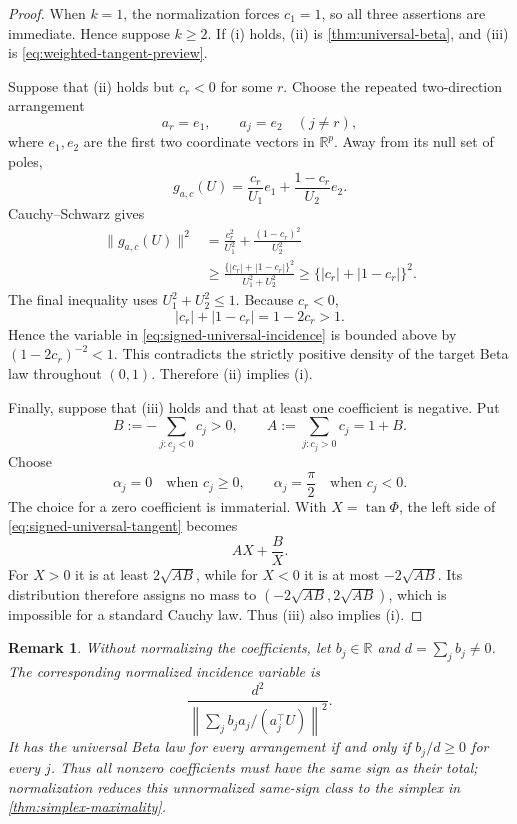 \documentclass[11pt]{article}
\numberwithin{equation}{section}
\theoremstyle{thmstyleone}%
\theoremstyle{thmstyletwo}%
\newtheorem*{remark}{Remark}%
\let\cref\autoref
\newcommand{\R}{\mathbb R}
\begin{document}
\begin{proof}
When \(k=1\), the normalization forces \(c_1=1\), so all three assertions
are immediate.  Hence suppose \(k\geq2\).
If \textup{(i)} holds, \textup{(ii)} is
\cref{thm:universal-beta}, and \textup{(iii)} is
\cref{eq:weighted-tangent-preview}.

Suppose that \textup{(ii)} holds but \(c_r<0\) for some \(r\).
Choose the repeated two-direction arrangement
\[
  a_r=e_1,
  \qquad
  a_j=e_2\quad(j\neq r),
\]
where \(e_1,e_2\) are the first two coordinate vectors in \(\R^p\).
Away from its null set of poles,
\[
  g_{a,c}(U)
  =
  \frac{c_r}{U_1}e_1
  +
  \frac{1-c_r}{U_2}e_2.
\]
Cauchy--Schwarz gives
\begin{align*}
  \|g_{a,c}(U)\|^2
  &=
  \frac{c_r^2}{U_1^2}
  +
  \frac{(1-c_r)^2}{U_2^2}\\
  &\geq
  \frac{\{|c_r|+|1-c_r|\}^2}{U_1^2+U_2^2}
  \geq
  \{|c_r|+|1-c_r|\}^2.
\end{align*}
The final inequality uses \(U_1^2+U_2^2\leq1\).
Because \(c_r<0\),
\[
  |c_r|+|1-c_r|=1-2c_r>1.
\]
Hence the variable in \cref{eq:signed-universal-incidence} is bounded above
by \((1-2c_r)^{-2}<1\).  This contradicts the strictly positive density of
the target Beta law throughout \((0,1)\).  Therefore \textup{(ii)} implies
\textup{(i)}.

Finally, suppose that \textup{(iii)} holds and that at least one coefficient
is negative.  Put
\[
  B:=-\sum_{j:c_j<0}c_j>0,
  \qquad
  A:=\sum_{j:c_j>0}c_j=1+B.
\]
Choose
\[
  \alpha_j=0\quad\text{when }c_j\geq0,
  \qquad
  \alpha_j=\frac{\pi}{2}\quad\text{when }c_j<0.
\]
The choice for a zero coefficient is immaterial.
With \(X=\tan\Phi\), the left side of
\cref{eq:signed-universal-tangent} becomes
\[
  AX+\frac{B}{X}.
\]
For \(X>0\) it is at least \(2\sqrt{AB}\), while for \(X<0\) it is at most
\(-2\sqrt{AB}\).  Its distribution therefore assigns no mass to
\((-2\sqrt{AB},2\sqrt{AB})\), which is impossible for a standard Cauchy
law.  Thus \textup{(iii)} also implies \textup{(i)}.
\end{proof}

\begin{remark}
Without normalizing the coefficients, let \(b_j\in\R\) and
\(d=\sum_jb_j\neq0\).  The corresponding normalized incidence variable is
\[
  \frac{d^2}{
    \left\|\sum_jb_j a_j/(a_j^\top U)\right\|^2}.
\]
It has the universal Beta law for every arrangement if and only if
\(b_j/d\geq0\) for every \(j\).  Thus all nonzero coefficients must have the
same sign as their total; normalization reduces this unnormalized same-sign
class to the simplex in \cref{thm:simplex-maximality}.
\end{remark}
\end{document}
